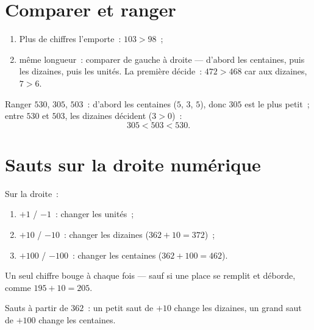 \section{Comparer et ranger}

\begin{method}\label{met:g2:numbers:compare}
\begin{enumerate}
  \item Plus de chiffres l'emporte~: $103 > 98$~;
  \item même longueur~: comparer de gauche à droite --- d'abord
        les centaines, puis les dizaines, puis les unités. La
        première  décide~: $472 > 468$ car aux
        dizaines, $7 > 6$.
\end{enumerate}
\end{method}

\begin{example}\label{ex:g2:numbers:order}
Ranger $530$, $305$, $503$~: d'abord les centaines ($5$, $3$, $5$),
donc $305$ est le plus petit~; entre $530$ et $503$, les dizaines
décident ($3 > 0$)~:
\[
305 < 503 < 530 .
\]
\end{example}

\section{Sauts sur la droite numérique}

\begin{method}\label{met:g2:numbers:jumps}
Sur la droite~:
\begin{enumerate}
  \item $+1$ / $-1$~: changer les unités~;
  \item $+10$ / $-10$~: changer les dizaines ($362 + 10 = 372$)~;
  \item $+100$ / $-100$~: changer les centaines
        ($362 + 100 = 462$).
\end{enumerate}
Un seul chiffre bouge à chaque fois --- sauf si une place
\guillemotleft{} se remplit \guillemotright{} et déborde, comme
$195 + 10 = 205$.
\end{method}

\begin{omfigure}

{\small Sauts à partir de $362$~: un petit saut de $+10$ change les
dizaines, un grand saut de $+100$ change les centaines.}
\end{omfigure}

